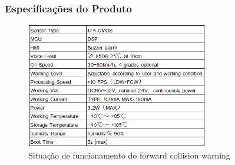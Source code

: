 \subsubsection{Especificações do Produto}

\begin{figure}[h]
  \centering
  \includegraphics[width=300px, scale=0.5]{figuras/especificacaiForwardCollision}
  \caption{Situação de funcionamento do forward collision warning}
  \label{table:especificacaiForwardCollision}
\end{figure}
